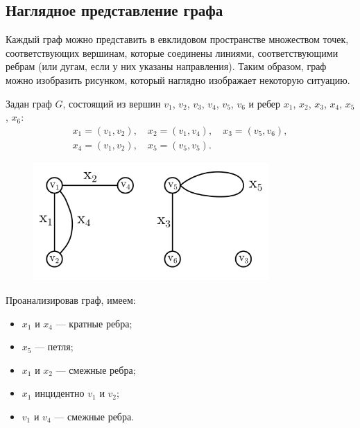 \subsection{Наглядное представление графа}

Каждый граф можно представить в евклидовом пространстве множеством точек, соответствующих вершинам, которые соединены линиями, соответствующими ребрам (или дугам, если у них указаны направления). Таким образом, граф можно изобразить рисунком, который наглядно изображает некоторую ситуацию.

\begin{example*}
    Задан граф \(G\), состоящий из вершин \(v_1\), \(v_2\), \(v_3\), \(v_4\), \(v_5\), \(v_6\) и ребер \(x_1\), \(x_2\), \(x_3\), \(x_4\), \(x_5\), \(x_6\):
    \begin{gather*}
        x_1 = (v_1, v_2),
        \quad
        x_2 = (v_1, v_4),
        \quad
        x_3 = (v_5, v_6),
        \\
        x_4 = (v_1, v_2),
        \quad
        x_5 = (v_5, v_5).
    \end{gather*}

    \begin{figure}[H]
        \centering
        \includegraphics[width=0.8\textwidth]{./images/graph-example.png}
    \end{figure}

    \noindent Проанализировав граф, имеем:
    \begin{itemize}
        \item \(x_1\) и \(x_4\) --- кратные ребра;
        \item \(x_5\) --- петля;
        \item \(x_1\) и \(x_2\) --- смежные ребра;
        \item \(x_1\) инцидентно \(v_1\) и \(v_2\);
        \item \(v_1\) и \(v_4\) --- смежные ребра.
    \end{itemize}
\end{example*}

